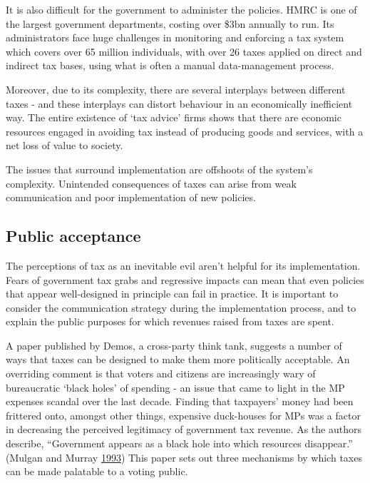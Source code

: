 \documentclass[]{tufte-handout}
\begin{document}
It is also difficult for the government to administer the policies. HMRC
is one of the largest government departments, costing over \$3bn
annually to run. Its administrators face huge challenges in monitoring
and enforcing a tax system which covers over 65 million individuals,
with over 26 taxes applied on direct and indirect tax bases, using what
is often a manual data-management process.

Moreover, due to its complexity, there are several interplays between
different taxes - and these interplays can distort behaviour in an
economically inefficient way. The entire existence of `tax advice' firms
shows that there are economic resources engaged in avoiding tax instead
of producing goods and services, with a net loss of value to society.

The issues that surround implementation are offshoots of the system's
complexity. Unintended consequences of taxes can arise from weak
communication and poor implementation of new policies.

\hypertarget{public-acceptance}{%
\subsection{Public acceptance}\label{public-acceptance}}

The perceptions of tax as an inevitable evil aren't helpful for its
implementation. Fears of government tax grabs and regressive impacts can
mean that even policies that appear well-designed in principle can fail
in practice. It is important to consider the communication strategy
during the implementation process, and to explain the public purposes
for which revenues raised from taxes are spent.

A paper published by Demos, a cross-party think tank, suggests a number
of ways that taxes can be designed to make them more politically
acceptable. An overriding comment is that voters and citizens are
increasingly wary of bureaucratic `black holes' of spending - an issue
that came to light in the MP expenses scandal over the last decade.
Finding that taxpayers' money had been frittered onto, amongst other
things, expensive duck-houses for MPs was a factor in decreasing the
perceived legitimacy of government tax revenue. As the authors describe,
``Government appears as a black hole into which resources disappear.''
(Mulgan and Murray \protect\hyperlink{ref-Mulgan1993}{1993}) This paper
sets out three mechanisms by which taxes can be made palatable to a
voting public.
\end{document}
